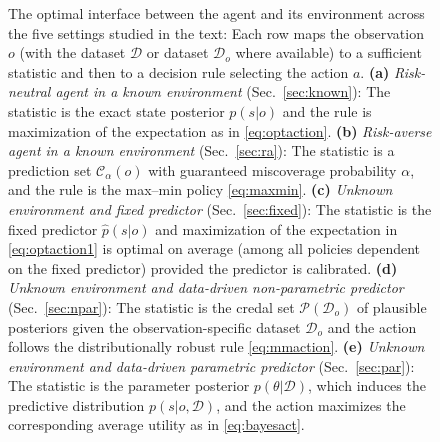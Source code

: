 \documentclass[journal]{IEEEtran}
\theoremstyle{definition}
\theoremstyle{remark}
\newcommand{\E}{\mathbb{E}}
\newcommand{\Dset}{\mathcal{D}}
\newcommand{\Pset}{\mathcal{P}}
\DeclareMathOperator*{\argmax}{arg\,max}
\begin{document}
\begin{figure}[t]
\caption{The optimal {interface} between the agent and its environment
across the five settings studied in the text: Each
row maps the observation $o$ (with the dataset $\Dset$ or dataset $\mathcal{D}_o$ where available) to a
{sufficient statistic} and then to a {decision rule} selecting the
action $a$. \textbf{(a)} \emph{Risk-neutral agent in a known environment} (Sec.~\ref{sec:known}): The
statistic is the exact state posterior $p(s| o)$ and the rule is 
maximization of the expectation as in  \eqref{eq:optaction}. \textbf{(b)} \emph{Risk-averse agent in a known environment} 
(Sec.~\ref{sec:ra}): The statistic is a prediction set
$\mathcal{C}_{\alpha}(o)$ with guaranteed miscoverage probability $\alpha$, and the rule is the max--min policy
\eqref{eq:maxmin}. \textbf{(c)} \emph{Unknown environment and fixed predictor} (Sec.~\ref{sec:fixed}):
The statistic is the fixed predictor $\hat{p}(s| o)$ and 
maximization of the expectation in  \eqref{eq:optaction1} is optimal on average (among all policies dependent on the fixed predictor)  provided the
predictor is calibrated. \textbf{(d)} \emph{Unknown environment and data-driven non-parametric predictor}
(Sec.~\ref{sec:npar}): The statistic is the credal set $\Pset(\Dset_o)$ of
plausible posteriors given the observation-specific dataset $\mathcal{D}_o$ and the action follows the distributionally robust rule
\eqref{eq:mmaction}. \textbf{(e)} \emph{Unknown environment and data-driven parametric predictor} 
(Sec.~\ref{sec:par}): The statistic is the parameter posterior
$p(\theta|\Dset)$, which induces the predictive distribution $p(s| o,\Dset)$, and the action maximizes the corresponding average utility as in 
\eqref{eq:bayesact}.}
\label{fig:racinterface}
\end{figure}


\end{document}
